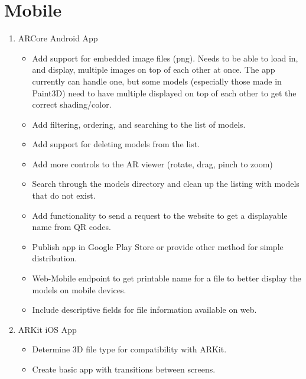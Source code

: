     \section{Mobile}
        \begin{enumerate}
            \item ARCore Android App
            \begin{itemize}
                \item Add support for embedded image files (png). Needs to be able to load in, and display, multiple images on top of each other at once.  The app currently can handle one, but some models (especially those made in Paint3D) need to have multiple displayed on top of each other to get the correct shading/color.

                \item Add filtering, ordering, and searching to the list of models.

                \item Add support for deleting models from the list.

                \item Add more controls to the AR viewer (rotate, drag, pinch to zoom)

                \item Search through the models directory and clean up the listing with models that do not exist.

                \item Add functionality to send a request to the website to get a displayable name from QR codes.

                \item Publish app in Google Play Store or provide other method for simple distribution.
 
                \item Web-Mobile endpoint to get printable name for a file to better display the models on mobile devices.

                \item Include descriptive fields for file information available on web. 

            \end{itemize}
            \item ARKit iOS App
            \begin{itemize}
                \item Determine 3D file type for compatibility with ARKit.

                \item Create basic app with transitions between screens.


\end{itemize}
\end{enumerate}
